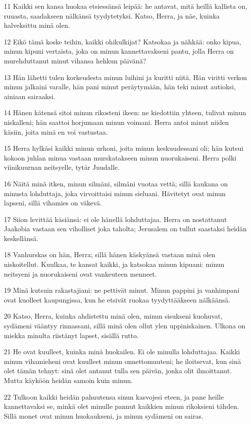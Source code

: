 \par 11 Kaikki sen kansa huokaa etsiessänsä leipää: he antavat, mitä heillä kallista on, ruuasta, saadakseen nälkänsä tyydytetyksi. Katso, Herra, ja näe, kuinka halveksittu minä olen.
\par 12 Eikö tämä koske teihin, kaikki ohikulkijat? Katsokaa ja nähkää: onko kipua, minun kipuni vertaista, joka on minun kannettavakseni pantu, jolla Herra on murehduttanut minut vihansa hehkun päivänä?
\par 13 Hän lähetti tulen korkeudesta minun luihini ja kuritti niitä. Hän viritti verkon minun jalkaini varalle, hän pani minut peräytymään, hän teki minut autioksi, ainiaan sairaaksi.
\par 14 Hänen kätensä sitoi minun rikosteni ikeen: ne kiedottiin yhteen, tulivat minun niskalleni; hän saattoi horjumaan minun voimani. Herra antoi minut niiden käsiin, joita minä en voi vastustaa.
\par 15 Herra hylkäsi kaikki minun urhoni, joita minun keskuudessani oli; hän kutsui kokoon juhlan minua vastaan murskatakseen minun nuorukaiseni. Herra polki viinikuurnan neitsyelle, tytär Juudalle.
\par 16 Näitä minä itken, minun silmäni, silmäni vuotaa vettä; sillä kaukana on minusta lohduttaja, joka virvoittaisi minun sieluani. Hävitetyt ovat minun lapseni, sillä vihamies on väkevä.
\par 17 Siion levittää käsiänsä: ei ole hänellä lohduttajaa. Herra on nostattanut Jaakobia vastaan sen viholliset joka taholta; Jerusalem on tullut saastaksi heidän keskellänsä.
\par 18 Vanhurskas on hän, Herra; sillä hänen käskyänsä vastaan minä olen niskoitellut. Kuulkaa, te kansat kaikki, ja katsokaa minun kipuani: minun neitsyeni ja nuorukaiseni ovat vankeuteen menneet.
\par 19 Minä kutsuin rakastajiani: ne pettivät minut. Minun pappini ja vanhimpani ovat kuolleet kaupungissa, kun he etsivät ruokaa tyydyttääkseen nälkäänsä.
\par 20 Katso, Herra, kuinka ahdistettu minä olen, minun sisukseni kuohuvat, sydämeni vääntyy rinnassani, sillä minä olen ollut ylen uppiniskainen. Ulkona on miekka minulta riistänyt lapset, sisällä rutto.
\par 21 He ovat kuulleet, kuinka minä huokailen. Ei ole minulla lohduttajaa. Kaikki minun vihamieheni ovat kuulleet minun onnettomuuteni; he iloitsevat, kun sinä olet tämän tehnyt: sinä olet antanut tulla sen päivän, jonka olit ilmoittanut. Mutta käyköön heidän samoin kuin minun.
\par 22 Tulkoon kaikki heidän pahuutensa sinun kasvojesi eteen, ja pane heille kannettavaksi se, minkä olet minulle pannut kaikkien minun rikoksieni tähden. Sillä monet ovat minun huokaukseni, ja minun sydämeni on sairas.

